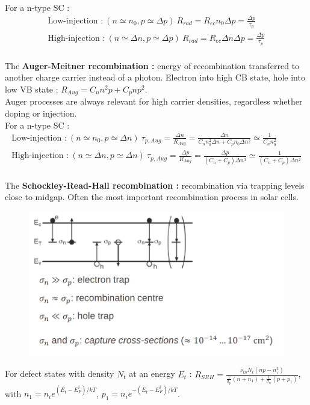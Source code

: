 \documentclass[../main.tex]{subfiles}
\begin{document}
For a n-type SC : \begin{equation}
    \begin{gathered}
        \text{Low-injection :}\: (n\simeq n_0, p\simeq \Delta p)\: R_{rad} = R_{ec} n_0 \Delta p = \frac{\Delta p}{\tau_p}\\
        \text{High-injection :}\: (n\simeq \Delta n, p\simeq \Delta p)\: R_{rad} =R_{ec} \Delta n \Delta p = \frac{\Delta p}{\tau_p}\\
    \end{gathered}
\end{equation}

The \textbf{Auger-Meitner recombination :} energy of recombination transferred to another charge carrier instead of a photon. Electron into high CB state, hole into low VB state : $R_{Aug} = C_nn^2p+C_p np^2$.\\
Auger processes are always relevant for high carrier densities, regardless whether doping or injection. \\

For a n-type SC : \begin{equation}
    \begin{gathered}
        \text{Low-injection :}\: (n\simeq n_0, p\simeq \Delta n)\: \tau_{p,Aug} = \frac{\Delta n}{R_{Aug}} = \frac{\Delta n}{C_n n_0^2 \Delta n + C_p n_0 \Delta n^2} \simeq \frac{1}{C_n n_0^2}\\
        \text{High-injection :}\: (n\simeq \Delta n, p\simeq \Delta n)\: \tau_{p,Aug} = \frac{\Delta p}{R_{Aug}} = \frac{\Delta p}{(C_n +C_p )\Delta n^3} \simeq \frac{1}{(C_n+C_p) \Delta n^2}\\
    \end{gathered}
\end{equation}

The \textbf{Schockley-Read-Hall recombination :} recombination via trapping levels close to midgap. Often the most important recombination process in solar cells. 
\begin{figure}[hbt!]
    \centering
    \includegraphics[width=0.5\linewidth]{IMAGES/PV/Screenshot from 2025-04-01 14-26-45.png}
\end{figure}
For defect states with density $N_t$ at an energy $E_t$ : $R_{SRH} = \frac{\nu_{th} N_t (np-n_i^2)}{\frac{1}{\sigma_p} (n+n_1) + \frac{1}{\sigma_n} (p+p_1)}$, with $n_1 = n_i e^{(E_t-E_F^i)/kT}$, $p_1 = n_i e^{-(E_t-E_F^i)/kT}$.\\
\end{document}
